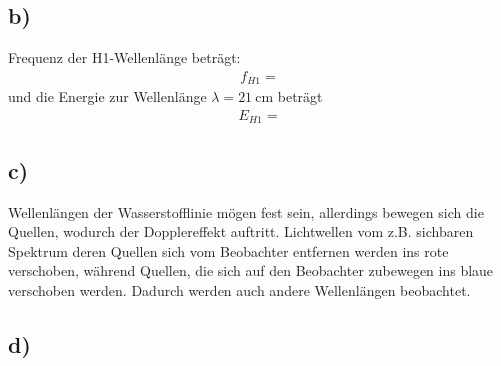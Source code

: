 \subsection{b)}

\justifying Frequenz der H1-Wellenlänge beträgt:
\begin{align*}
    f_{H1}=\text{}
\end{align*}
und die Energie zur Wellenlänge $\lambda = \SI{21}{\centi\meter} $ beträgt
\begin{align}
    E_{H1}=\text{}
\end{align}


\subsection{c)}

\justifying Wellenlängen der Wasserstofflinie mögen fest sein, allerdings bewegen sich
die Quellen, wodurch der Dopplereffekt auftritt. Lichtwellen vom z.B. sichbaren Spektrum deren Quellen sich vom
Beobachter entfernen werden ins rote verschoben, während Quellen, die sich auf den
Beobachter zubewegen ins blaue verschoben werden. Dadurch werden auch andere Wellenlängen  
beobachtet. 


\subsection{d)}



